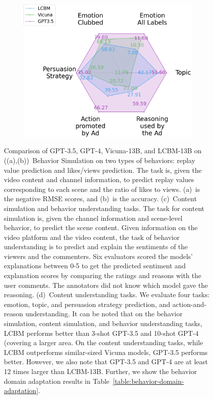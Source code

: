 \begin{figure}[!t]
{{\begin{subfigure}[b]{0.24\textwidth}
    \includegraphics[width=1\textwidth]{images/content_understanding_scores.pdf}
    \caption{}
\end{subfigure}
\fi
}}
    \caption{
    \label{fig:capabilities-radarplot}
    Comparison of GPT-3.5, GPT-4, Vicuna-13B, and LCBM-13B on ((a),(b))~Behavior Simulation on two types of behaviors: replay value prediction and likes/views prediction. The task is, given the video content and channel information, to predict replay values corresponding to each scene and the ratio of likes to views. (a)~is the negative RMSE scores, and (b)~is the accuracy.
    (c)~Content simulation and behavior understanding tasks. The task for content simulation is, given the channel information and scene-level behavior, to predict the scene content. Given information on the video platform and the video content, the task of behavior understanding is to predict and explain the sentiments of the viewers and the commenters. %
    Six evaluators scored the models' explanations between 0-5 to get the predicted sentiment and explanation scores by comparing the ratings and reasons with the user comments. The annotators did not know which model gave the reasoning.
    (d)~Content understanding tasks. We evaluate four tasks: emotion, topic, and persuasion strategy prediction, and action-and-reason understanding. It can be noted that on the behavior simulation, content simulation, and behavior understanding tasks, LCBM performs better than 3-shot GPT-3.5 and 10-shot GPT-4 (covering a larger area. On the content understanding tasks, while LCBM outperforms similar-sized Vicuna models, GPT-3.5 performs better. However, we also note that GPT-3.5 and GPT-4 are at least 12 times larger than LCBM-13B. Further, we show the behavior domain adaptation results in Table~\ref{table:behavior-domain-adaptation}.
    }
\end{figure}







